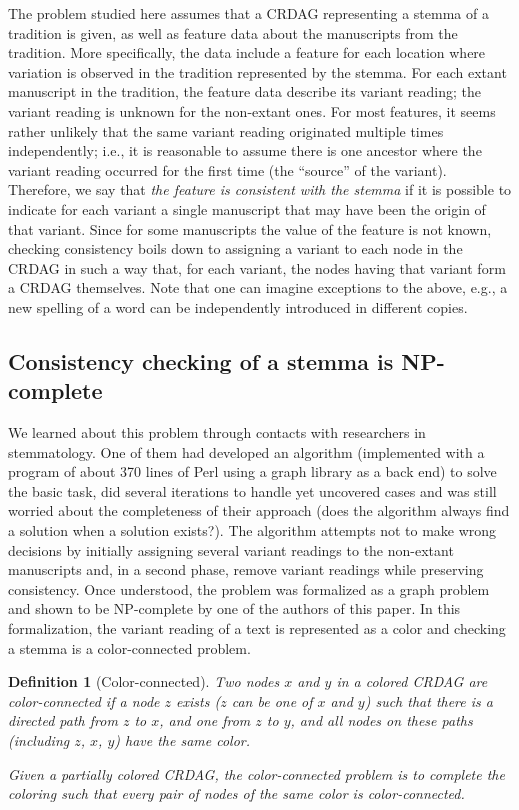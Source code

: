 \documentclass{tlp}
\renewcommand{\|}{\ensuremath{\,|\,}}
\newtheorem{definition}{Definition}
\renewcommand{\|}{\,|\,}
\begin{document}
The problem studied here assumes that a CRDAG representing a stemma of
a tradition is given, as well as feature data about the manuscripts
from the tradition.  More specifically, the data include a feature for
each location where variation is observed in the tradition represented
by the stemma. For each extant manuscript in the tradition, the
feature data describe its variant reading; the variant reading is
unknown for the non-extant ones.  For most features, it seems rather
unlikely that the same variant reading originated multiple times
independently; i.e., it is reasonable to assume there is one ancestor
where the variant reading occurred for the first time (the ``source''
of the variant). Therefore, we say that {\em the feature is
  consistent with the stemma} if it is possible to indicate for each
variant a single manuscript that may have been the origin of that
variant.  Since for some manuscripts the value of the feature is not
known, checking consistency boils down to assigning a variant to each
node in the CRDAG in such a way that, for each variant, the nodes
having that variant form a CRDAG themselves. Note that one can imagine
exceptions to the above, e.g., a new spelling of a word can be
independently introduced in different copies.



\subsection{Consistency checking of a stemma is NP-complete}

We learned about this problem through contacts with researchers in
stemmatology. One of them had developed an algorithm 
(implemented with a program of about 370 lines of Perl
using a graph library as a back end) to solve the basic task, did
several iterations to handle yet uncovered cases and was still
worried about the completeness of their approach (does the algorithm
always find a solution when a solution exists?). The algorithm
attempts not to make wrong decisions by initially assigning several
variant readings to the non-extant manuscripts and, in a second phase,
remove variant readings while preserving consistency. Once understood,
the problem was formalized as a graph problem and shown to be
NP-complete by one of the authors of this paper. In this
formalization, the variant reading of a text is represented as a color
and checking a stemma is a color-connected problem.

\begin{definition} [Color-connected]
  Two nodes $x$ and $y$ in a colored CRDAG are {\em color-connected}
  if a node $z$ exists ($z$ can be one of $x$ and $y$) such that there
  is a directed path from $z$ to $x$, and one from $z$ to $y$, and all
  nodes on these paths (including $z$, $x$, $y$) have the same color.

  Given a partially colored CRDAG, the {\em color-connected problem} is to
  complete the coloring such that every pair of nodes of the same
  color is color-connected.
\end{definition}
\end{document}
